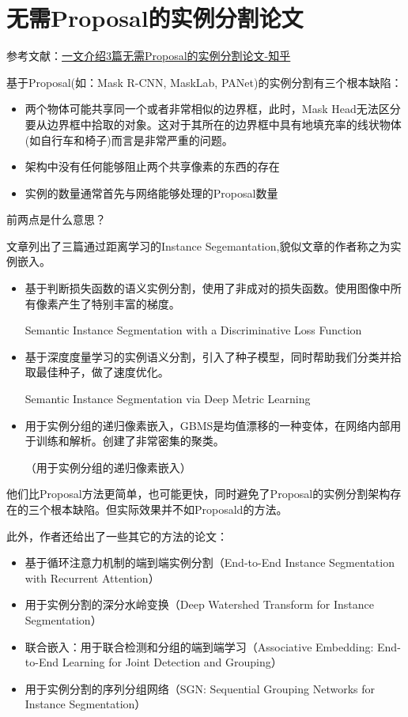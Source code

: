 \section{无需Proposal的实例分割论文}

参考文献：\href{https://zhuanlan.zhihu.com/p/35770716}{一文介绍3篇无需Proposal的实例分割论文-知乎}

基于Proposal(如：Mask R-CNN, MaskLab, PANet)的实例分割有三个根本缺陷：
\begin{itemize}
\item 两个物体可能共享同一个或者非常相似的边界框，此时，Mask Head无法区分要从边界框中拾取的对象。这对于其所在的边界框中具有地填充率的线状物体(如自行车和椅子)而言是非常严重的问题。
\item 架构中没有任何能够阻止两个共享像素的东西的存在
\item 实例的数量通常首先与网络能够处理的Proposal数量
\end{itemize}

前两点是什么意思？

文章列出了三篇通过距离学习的Instance Segemantation,貌似文章的作者称之为实例嵌入。
\begin{itemize}
\item 基于判断损失函数的语义实例分割，使用了非成对的损失函数。使用图像中所有像素产生了特别丰富的梯度。

 Semantic Instance Segmentation with a Discriminative Loss Function

\item 基于深度度量学习的实例语义分割，引入了种子模型，同时帮助我们分类并拾取最佳种子，做了速度优化。

Semantic Instance Segmentation via Deep Metric Learning

\item 用于实例分组的递归像素嵌入，GBMS是均值漂移的一种变体，在网络内部用于训练和解析。创建了非常密集的聚类。

（用于实例分组的递归像素嵌入）

\end{itemize}

他们比Proposal方法更简单，也可能更快，同时避免了Proposal的实例分割架构存在的三个根本缺陷。但实际效果并不如Proposald的方法。

此外，作者还给出了一些其它的方法的论文：
\begin{itemize}
\item 基于循环注意力机制的端到端实例分割（End-to-End Instance Segmentation with Recurrent Attention）
\item 用于实例分割的深分水岭变换（Deep Watershed Transform for Instance Segmentation）
\item 联合嵌入：用于联合检测和分组的端到端学习（Associative Embedding: End-to-End Learning for Joint Detection and Grouping）
\item 用于实例分割的序列分组网络（SGN: Sequential Grouping Networks for Instance Segmentation）
\end{itemize}


